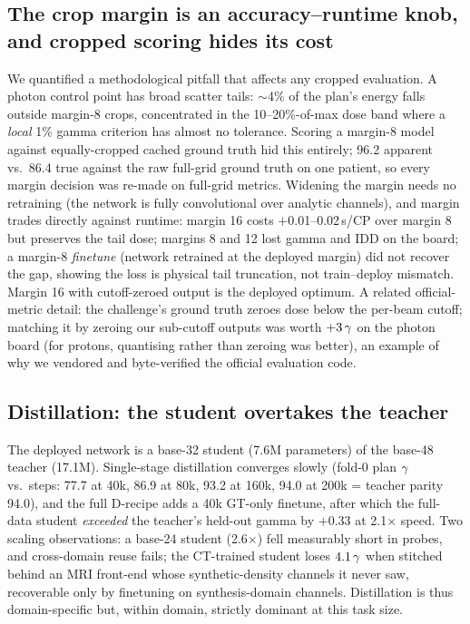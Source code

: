 \documentclass{llncs}
\begin{document}
\subsection{The crop margin is an accuracy--runtime knob, and cropped scoring hides its cost}
We quantified a methodological pitfall that affects any cropped evaluation. A photon control point has
broad scatter tails: $\sim$4\% of the plan's energy falls outside margin-8 crops, concentrated
in the 10--20\%-of-max dose band where a \emph{local} 1\% gamma criterion has almost no
tolerance. Scoring a margin-8 model against equally-cropped cached ground truth hid this
entirely; 96.2 apparent vs.\ 86.4 true against the raw full-grid ground truth on one
patient, so every margin decision was re-made on full-grid metrics. Widening the margin needs
no retraining (the network is fully convolutional over analytic channels), and margin trades
directly against runtime: margin 16 costs $+$0.01--0.02\,s/CP over margin 8 but preserves the
tail dose; margins 8 and 12 lost gamma and IDD on the board; a margin-8 \emph{finetune} (network
retrained at the deployed margin) did not recover the gap, showing the loss is physical tail
truncation, not train--deploy mismatch. Margin 16 with cutoff-zeroed output is the deployed
optimum. A related official-metric detail: the challenge's ground truth zeroes dose below the
per-beam cutoff; matching it by zeroing our sub-cutoff outputs was worth $+3\,\gamma$ on the
photon board (for protons, quantising rather than zeroing was better), an example of why we
vendored and byte-verified the official evaluation code.

\subsection{Distillation: the student overtakes the teacher}
The deployed network is a base-32 student (7.6M parameters) of the base-48 teacher (17.1M).
Single-stage distillation converges slowly (fold-0 plan $\gamma$ vs.\ steps: 77.7 at 40k, 86.9 at
80k, 93.2 at 160k, 94.0 at 200k = teacher parity 94.0), and the full D-recipe adds a 40k GT-only
finetune, after which the full-data student \emph{exceeded} the teacher's held-out gamma by
$+0.33$ at 2.1$\times$ speed. Two scaling observations: a base-24 student (2.6$\times$) fell
measurably short in probes, and cross-domain reuse fails; the CT-trained student loses
$4.1\,\gamma$ when stitched behind an MRI front-end whose synthetic-density channels it never saw,
recoverable only by finetuning on synthesis-domain channels. Distillation is thus
domain-specific but, within domain, strictly dominant at this task size.
\end{document}
